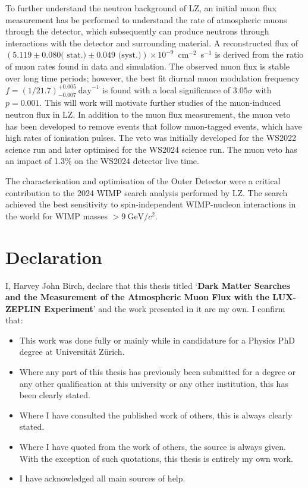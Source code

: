 \documentclass[a4paper,11pt,usegeometry]{scrreprt} %
\begin{document}
To further understand the neutron background of LZ, an initial muon flux measurement has be performed to understand the rate of atmospheric muons through the detector, which subsequently can produce neutrons through interactions with the detector and surrounding material. A reconstructed flux of $(5.119 \pm 0.080 \textrm{( stat.)} \pm 0.049 \textrm{ (syst.)})\times10^{-9}$~cm$^{-2}$~s$^{-1}$ is derived from the ratio of muon rates found in data and simulation. The observed muon flux is stable over long time periods; however, the best fit diurnal muon modulation frequency $f=(1/21.7)^{+0.005}_{-0.007}~\text{day}^{-1}$ is found with a local significance of $3.05\sigma$ with $p=0.001$. This will work will motivate further studies of the muon-induced neutron flux in LZ.
In addition to the muon flux measurement, the muon veto has been developed to remove events that follow muon-tagged events, which have high rates of ionisation pulses. The veto was initially developed for the WS2022 science run and later optimised for the WS2024 science run. The muon veto has an impact of 1.3\% on the WS2024 detector live time. 

The characterisation and optimisation of the Outer Detector were a critical contribution to the 2024 WIMP search analysis performed by LZ. The search achieved the best sensitivity to spin-independent WIMP-nucleon interactions in the world for WIMP masses $>9~\text{GeV}/c^2$.

\newpage\null\thispagestyle{empty}\newpage

\chapter*{Declaration}
\vskip 1in
I, Harvey John Birch, declare that this thesis titled ‘\textbf{Dark Matter Searches and the Measurement of the Atmospheric Muon Flux with the LUX-ZEPLIN Experiment}’ and the work presented in it are my own. I confirm that:
\bigbreak

\begin{itemize}
\item This work was done fully or mainly while in candidature for a Physics PhD degree at Universit\"at Z\"urich.
\item Where any part of this thesis has previously been submitted for a degree or any other qualification at this university or any other institution, this has been clearly stated.
\item Where I have consulted the published work of others, this is always clearly stated.
\item Where I have quoted from the work of others, the source is always given. With the exception of such quotations, this thesis is entirely my own work.
\item I have acknowledged all main sources of help.
\end{itemize}
\vskip 2in
\end{document}
